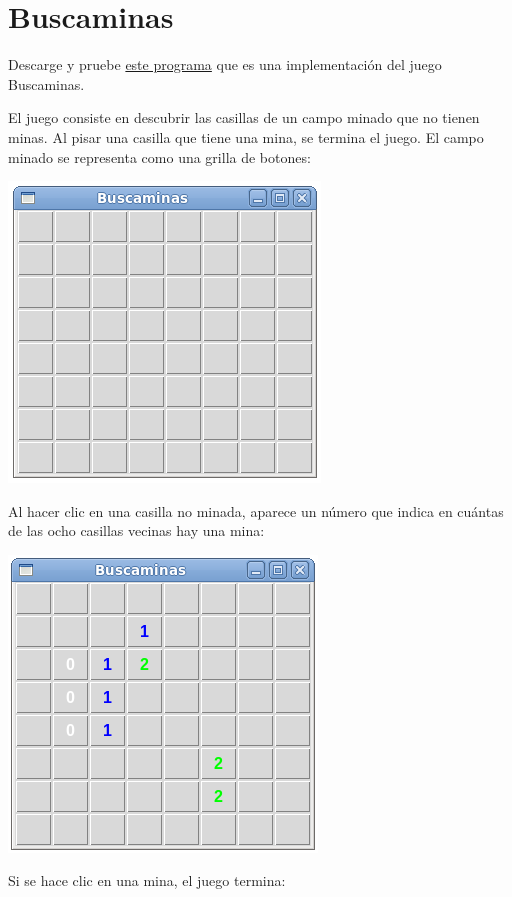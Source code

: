 \section{Buscaminas}

Descarge y pruebe
\href{../../\_static/programas/tkinter/buscaminas.py}{este programa} que
es una implementación del juego Buscaminas.

El juego consiste en descubrir las casillas de un campo minado que no
tienen minas. Al pisar una casilla que tiene una mina, se termina el
juego. El campo minado se representa como una grilla de botones:

\includegraphics{../../_static/capturas/bm0.png}

Al hacer clic en una casilla no minada, aparece un número que indica en
cuántas de las ocho casillas vecinas hay una mina:

\includegraphics{../../_static/capturas/bm1.png}

Si se hace clic en una mina, el juego termina:

